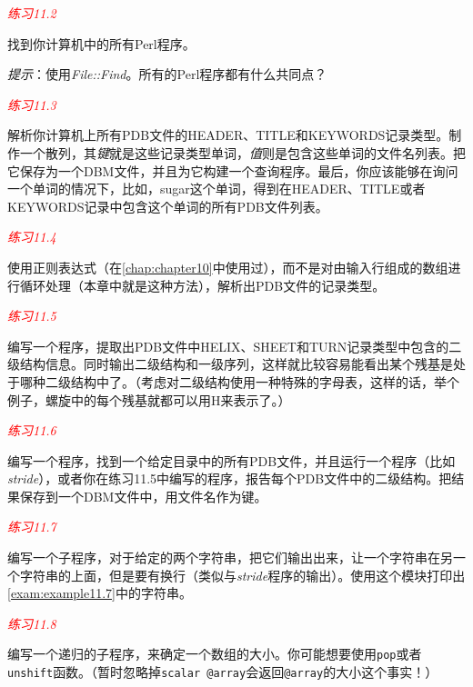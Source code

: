 \textcolor{red}{\textit{练习11.2}}
\begin{adjustwidth}{4em}{}
找到你计算机中的所有Perl程序。

\textit{提示}：使用\textit{File::Find}。所有的Perl程序都有什么共同点？
\end{adjustwidth}

\textcolor{red}{\textit{练习11.3}}
\begin{adjustwidth}{4em}{}
  解析你计算机上所有PDB文件的HEADER、TITLE和KEYWORDS记录类型。制作一个散列，其\textit{键}就是这些记录类型单词，\textit{值}则是包含这些单词的文件名列表。把它保存为一个DBM文件，并且为它构建一个查询程序。最后，你应该能够在询问一个单词的情况下，比如，sugar这个单词，得到在HEADER、TITLE或者KEYWORDS记录中包含这个单词的所有PDB文件列表。
\end{adjustwidth}

\textcolor{red}{\textit{练习11.4}}
\begin{adjustwidth}{4em}{}
使用正则表达式（在\autoref{chap:chapter10}中使用过），而不是对由输入行组成的数组进行循环处理（本章中就是这种方法），解析出PDB文件的记录类型。
\end{adjustwidth}

\textcolor{red}{\textit{练习11.5}}
\begin{adjustwidth}{4em}{}
编写一个程序，提取出PDB文件中HELIX、SHEET和TURN记录类型中包含的二级结构信息。同时输出二级结构和一级序列，这样就比较容易能看出某个残基是处于哪种二级结构中了。（考虑对二级结构使用一种特殊的字母表，这样的话，举个例子，螺旋中的每个残基就都可以用H来表示了。）
\end{adjustwidth}

\textcolor{red}{\textit{练习11.6}}
\begin{adjustwidth}{4em}{}
编写一个程序，找到一个给定目录中的所有PDB文件，并且运行一个程序（比如\textit{stride}），或者你在练习11.5中编写的程序，报告每个PDB文件中的二级结构。把结果保存到一个DBM文件中，用文件名作为键。
\end{adjustwidth}

\textcolor{red}{\textit{练习11.7}}
\begin{adjustwidth}{4em}{}
编写一个子程序，对于给定的两个字符串，把它们输出出来，让一个字符串在另一个字符串的上面，但是要有换行（类似与\textit{stride}程序的输出）。使用这个模块打印出\autoref{exam:example11.7}中的字符串。
\end{adjustwidth}

\textcolor{red}{\textit{练习11.8}}
\begin{adjustwidth}{4em}{}
编写一个递归的子程序，来确定一个数组的大小。你可能想要使用\verb|pop|或者\verb|unshift|函数。（暂时忽略掉\verb|scalar @array|会返回\verb|@array|的大小这个事实！）
\end{adjustwidth}

